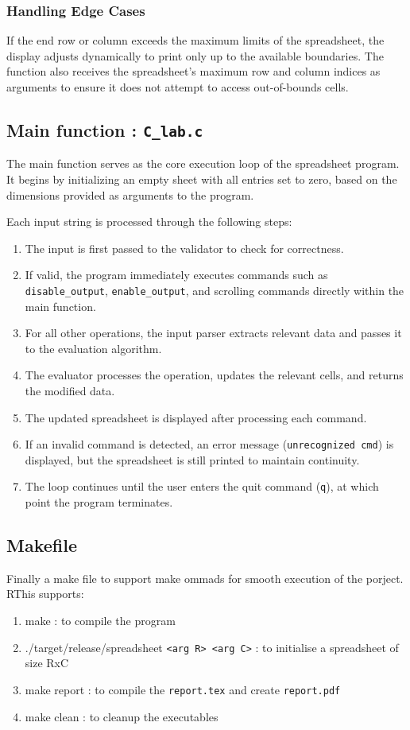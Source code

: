 \documentclass{report}
\begin{document}
\subsubsection*{Handling Edge Cases}
If the end row or column exceeds the maximum limits of the spreadsheet, the display adjusts dynamically to print only up to the available boundaries. The function also receives the spreadsheet’s maximum row and column indices as arguments to ensure it does not attempt to access out-of-bounds cells.


\subsection*{Main function : \texttt{C\_lab.c}}
The main function serves as the core execution loop of the spreadsheet program. It begins by initializing an empty sheet with all entries set to zero, based on the dimensions provided as arguments to the program.

Each input string is processed through the following steps:
\begin{enumerate}
    \item The input is first passed to the validator to check for correctness.
    \item If valid, the program immediately executes commands such as \texttt{disable\_output}, \texttt{enable\_output}, and scrolling commands directly within the main function.
    \item For all other operations, the input parser extracts relevant data and passes it to the evaluation algorithm.
    \item The evaluator processes the operation, updates the relevant cells, and returns the modified data.
    \item The updated spreadsheet is displayed after processing each command.
    \item If an invalid command is detected, an error message (\texttt{unrecognized cmd}) is displayed, but the spreadsheet is still printed to maintain continuity.
    \item The loop continues until the user enters the quit command (\texttt{q}), at which point the program terminates.
\end{enumerate}

\subsection*{Makefile}
Finally a make file to support make ommads for smooth execution of the porject. RThis supports:
\begin{enumerate}
    \item make : to compile the program
    \item ./target/release/spreadsheet \texttt{<arg R> <arg C>} : to initialise a spreadsheet of size RxC
    \item make report : to compile the \texttt{report.tex} and create \texttt{report.pdf}
    \item make clean : to cleanup the executables
\end{enumerate}
\end{document}
